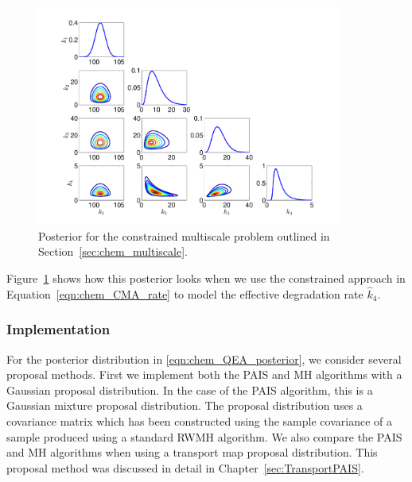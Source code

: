 \documentclass[final]{siamltex}
\begin{document}
\begin{figure}[htb]
\centering
\includegraphics[width=0.9\textwidth]{"images/CMA_posterior"}
\caption{Posterior for the constrained multiscale problem outlined in Section~\ref{sec:chem_multiscale}.}
\label{fig:chem_CMA_posterior}
\end{figure}

Figure~\ref{fig:chem_CMA_posterior} shows how this posterior looks when we use the constrained approach in Equation~\eqref{eqn:chem_CMA_rate} to model the effective degradation rate $\hat{k}_4$.

\subsubsection{Implementation}\label{sec:chem_implementation}

For the posterior distribution in \eqref{eqn:chem_QEA_posterior}, we consider several proposal methods. First we implement both the PAIS and MH algorithms with a Gaussian proposal distribution. In the case of the PAIS algorithm, this is a Gaussian mixture proposal distribution. The proposal distribution uses a covariance matrix which has been constructed using the sample covariance of a sample produced using a standard RWMH algorithm. We also compare the PAIS and MH algorithms when using a transport map proposal distribution. This proposal method was discussed in detail in Chapter~\ref{sec:TransportPAIS}.
\end{document}
